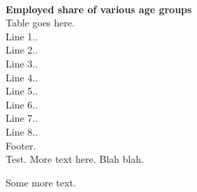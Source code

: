 \documentclass{report}
\begin{document}
\vspace{4mm}\\
\textbf{Employed share of various age groups}
\vspace{2mm}\\
Table goes here.
\vspace{1.1mm}\\
Line 1..
\vspace{1.1mm}\\
Line 2..
\vspace{1.1mm}\\
Line 3..
\vspace{1.1mm}\\
Line 4..
\vspace{1.1mm}\\
Line 5..
\vspace{1.1mm}\\
Line 6..
\vspace{1.1mm}\\
Line 7..
\vspace{1.1mm}\\
Line 8..
\vspace{1.5mm}\\
Footer.\\


\newpage
\thispagestyle{main}
Test. More text here. Blah blah.

\vspace{20mm}

Some more text.
\end{document}
